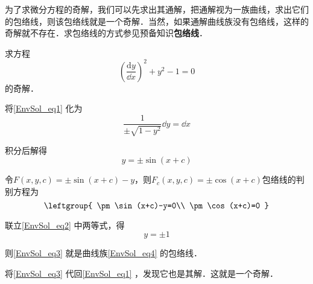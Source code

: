 为了求微分方程的奇解，我们可以先求出其通解，把通解视为一族曲线，求出它们的包络线，则该包络线就是一个奇解．当然，如果通解曲线族没有包络线，这样的奇解就不存在．求包络线的方式参见预备知识\textbf{包络线}．

\begin{example}{}
求方程
\begin{equation}\label{EnvSol_eq1}
(\frac{\mathrm{d} y}{\dd x})^2+y^2-1=0
\end{equation}
的奇解．

将\autoref{EnvSol_eq1} 化为
\begin{equation}
\frac{1}{\pm\sqrt{1-y^2}}\dd y=\dd x
\end{equation}

积分后解得
\begin{equation}\label{EnvSol_eq4}
y=\pm\sin(x+c)
\end{equation}

令$F(x, y, c)=\pm\sin(x+c)-y$，则$F_c(x, y, c)=\pm\cos(x+c)$包络线的判别方程为
\begin{equation}\label{EnvSol_eq2}
\leftgroup{
    \pm\sin(x+c)-y=0\\
    \pm\cos(x+c)=0
}
\end{equation}

联立\autoref{EnvSol_eq2} 中两等式，得
\begin{equation}\label{EnvSol_eq3}
y=\pm 1
\end{equation}

则\autoref{EnvSol_eq3} 就是曲线族\autoref{EnvSol_eq4} 的包络线．

将\autoref{EnvSol_eq3} 代回\autoref{EnvSol_eq1} ，发现它也是其解．这就是一个奇解．


\end{example}
























